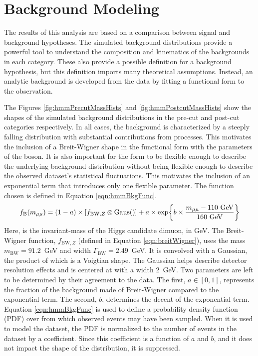 \section{Background Modeling}\label{sec:hmmBkg}

The results of this analysis are based on a comparison between signal and background hypotheses.
The simulated background distributions provide a powerful tool to understand the composition and kinematics of the backgrounds in each category.  
These also provide a possible definition for a background hypothesis, but this definition imports many theoretical assumptions.
Instead, an analytic background is developed from the data by fitting a functional form to the observation.

The Figures \ref{fig:hmmPrecutMassHists} and \ref{fig:hmmPostcutMassHists} show the \muu shapes of the simulated background distributions in the pre-cut and post-cut categories respectively.
In all cases, the background is characterized by a steeply falling \muu distribution with substantial contributions from \Z processes.
This motivates the inclusion of a Breit-Wigner shape in the functional form with the parameters of the \Z boson.
It is also important for the form to be flexible enough to describe the underlying background distribution without being flexible enough to describe the observed dataset's statistical fluctuations.
This motivates the inclusion of an exponential term that introduces only one flexible parameter.
The function chosen is defined in Equation \ref{eqn:hmmBkgFunc}. 
\begin{equation}\begin{split}\label{eqn:hmmBkgFunc}
    f_\text{B}(\muu) = (1-a)\times [f_{\text{BW},Z}\otimes\text{Gaus}()]+a\times\exp{b\times\frac{\muu-110\text{ GeV}}{160\text{ GeV}}}
\end{split}\end{equation} 
Here, \muu is the invariant-mass of the Higgs candidate dimuon, in GeV.
The Breit-Wigner function, $f_{\text{BW},Z}$ (defined in Equation \ref{eqn:breitWigner}), uses the \Z mass $m_\text{BW}=91.2$~GeV and width $\Gamma_\text{BW}=2.49$~GeV.
It is convolved with a Gaussian, the product of which is a Voigtian shape.
The Gaussian helps describe detector resolution effects and is centered at \muu with a width 2~GeV.
Two parameters are left to be determined by their agreement to the data.
The first, $a\in[0,1]$, represents the fraction of the background made of Breit-Wigner compared to the exponential term.
The second, $b$, determines the decent of the exponential term.
Equation \ref{eqn:hmmBkgFunc} is used to define a probability density function (PDF) over \mll from which observed events may have been sampled. 
When it is used to model the dataset, the PDF is normalized to the number of events in the dataset by a coefficient.
Since this coefficient is a function of $a$ and $b$, and it does not impact the shape of the distribution, it is suppressed.

